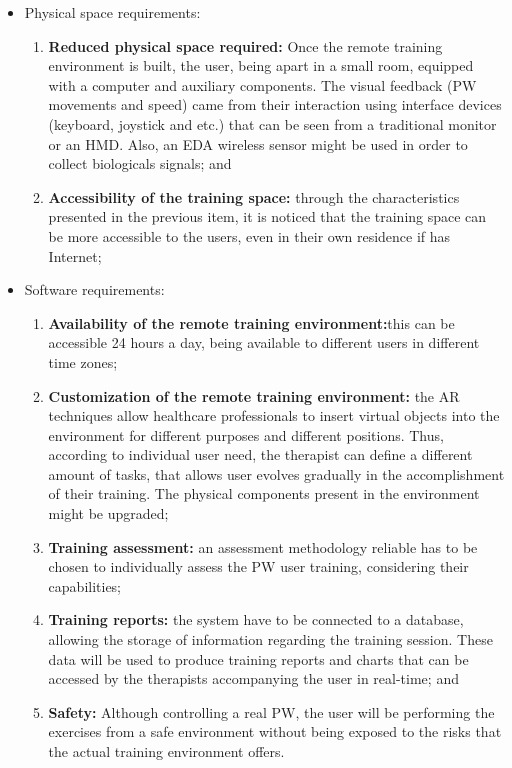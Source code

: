 \begin{itemize}
\item Physical space requirements:
\begin{enumerate}
\item \textbf{Reduced physical space required: }Once the remote training environment is built, the user, being apart in a small room, equipped with a computer and auxiliary components. The visual feedback (PW movements and speed) came from their interaction using interface devices (keyboard, joystick and etc.) that can be seen from a traditional monitor or an HMD. Also, an EDA wireless sensor might be used in order to collect biologicals signals; and
\item \textbf{Accessibility of the training space: } through the characteristics presented in the previous item, it is noticed that the training space can be more accessible to the users, even in their own residence if has Internet;
\end{enumerate}
\item Software requirements:
\begin{enumerate}
\item \textbf{Availability of the remote training environment:}this can be accessible 24 hours a day, being available to different users in different time zones;
\item \textbf{Customization of the remote training environment:} the AR techniques allow healthcare professionals to insert virtual objects into the environment for different purposes and different positions. Thus, according to individual user need, the therapist can define a different amount of tasks, that allows user evolves gradually in the accomplishment of their training. The physical components present in the environment might be upgraded;
\item \textbf{Training assessment:} an assessment methodology reliable has to be chosen to individually assess the PW user training, considering their capabilities;
\item \textbf{Training reports: }the system have to be connected to a database, allowing the storage of information regarding the training session. These data will be used to produce training reports and charts that can be accessed by the therapists accompanying the user in real-time; and
\item \textbf{Safety:} Although controlling a real PW, the user will be performing the exercises from a safe environment without being exposed to the risks that the actual training environment offers.
\end{enumerate}
\end{itemize}

